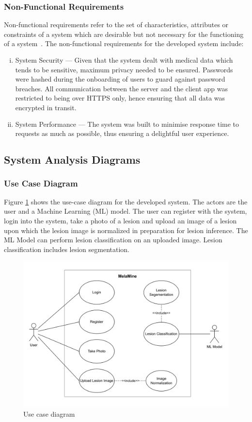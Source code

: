 \documentclass[12pt, a4paper]{article}
\begin{document}
\subsubsection{Non-Functional Requirements}
Non-functional requirements refer to the set of characteristics, attributes or constraints of a system which are desirable but not necessary for the functioning of a system~\citep{glinz2007non}. The non-functional requirements for the developed system include:
\begin{enumerate}[i.]
    \item System Security --- Given that the system dealt with medical data which tends to be sensitive, maximum privacy needed to be ensured. Passwords were hashed during the onboarding of users to guard against password breaches. All communication between the server and the client app was restricted to being over HTTPS only, hence ensuring that all data was encrypted in transit.
    \item System Performance --- The system was built to minimise response time to requests as much as possible, thus ensuring a delightful user experience.
\end{enumerate}
\subsection{System Analysis Diagrams}
\subsubsection{Use Case Diagram}
Figure \ref{fig:use-case} shows the use-case diagram for the developed system. The actors are the user and a Machine Learning (ML) model. The user can register with the system, login into the system, take a photo of a lesion and upload an image of a lesion upon which the lesion image is normalized in preparation for lesion inference. The ML Model can perform lesion classification on an uploaded image. Lesion classification includes lesion segmentation.
\begin{figure}[h]
    \centering
    \setlength{\fboxsep}{8pt}
    \includegraphics[scale=0.12, fbox]{use-case.png}
    \caption{Use case diagram}
    \label{fig:use-case}
\end{figure}
\end{document}
